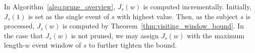 In Algorithm~\ref{algo:prune_overview}, $J_s(w)$ is computed incrementally. Initially, $J_s(1)$
is set as the single event of $s$ with highest value. Then, as the subject $s$ is processed,
$J_s(w)$ is computed by Theorem~\ref{thm:visiting_window_bound}. In the case that $J_s(w)$ is not 
pruned, we may assign $J_s(w)$ with the maximum length-$w$ event window of $s$ to further tighten
the bound. 





